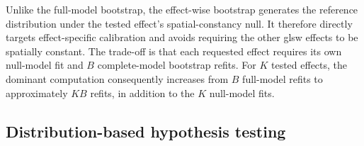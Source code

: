 \documentclass[times]{interact}
\theoremstyle{plain}%
\theoremstyle{definition}
\theoremstyle{remark}
\begin{document}
Unlike the full-model bootstrap, the effect-wise bootstrap generates the reference distribution under the tested effect's spatial-constancy null.
It therefore directly targets effect-specific calibration and avoids requiring the other \gls{glsw} effects to be spatially constant.
The trade-off is that each requested effect requires its own null-model fit and $B$ complete-model bootstrap refits.
For $K$ tested effects, the dominant computation consequently increases from $B$ full-model refits to approximately $KB$ refits, in addition to the $K$ null-model fits.

\subsection{Distribution-based hypothesis testing}\label{sec:test-hgwr-glsw-ftest}
\end{document}
